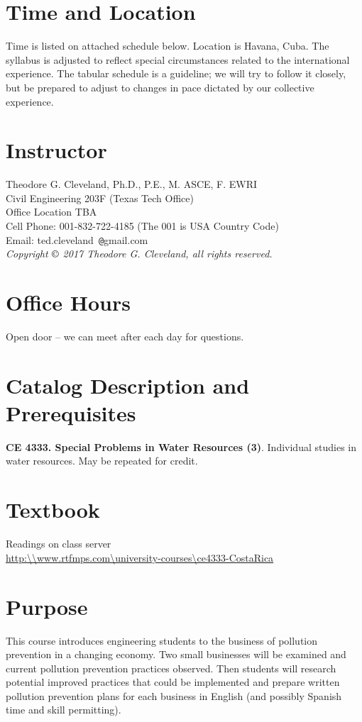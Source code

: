 \documentclass[12pt]{article}
\begin{document}
\section*{ }
\section*{Time and Location}
Time is listed on attached schedule below.  
Location is Havana, Cuba.
The syllabus is adjusted to reflect special circumstances related to the international experience.   
The tabular schedule is a guideline; we will try to follow it closely, but be prepared to adjust to changes in pace dictated by our collective experience.
\section*{Instructor}
Theodore G. Cleveland, Ph.D., P.E., M. ASCE, F. EWRI\\
Civil Engineering 203F (Texas Tech Office)\\
Office Location TBA \\
Cell Phone: 001-832-722-4185  (The 001 is USA Country Code)\\
Email: ted.cleveland~\texttt{@}gmail.com\\
\textsl{Copyright $\copyright$ 2017 Theodore G. Cleveland, all rights reserved.} 
\section*{Office Hours}
Open door -- we can meet after each day for questions.
\section*{Catalog Description and Prerequisites}
\textbf{CE 4333. Special Problems in Water Resources (3)}. Individual studies in water resources. May be repeated for credit.
\section*{Textbook}
Readings on class server \\ \url{http:\\www.rtfmps.com\university-courses\ce4333-CostaRica}
\section*{Purpose}
This course introduces engineering students to the business of pollution prevention in a changing economy.  Two small businesses will be examined and current pollution prevention practices observed.  Then students will research potential improved practices that could be implemented and prepare written pollution prevention plans for each business in English (and possibly Spanish time and skill permitting).
\end{document}

